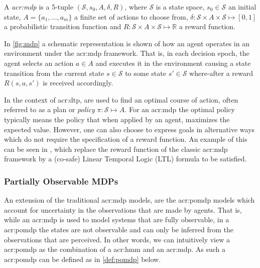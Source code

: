 \begin{definition}
	\label{def:mdp}
	A \textit{\acrfull{acr:mdp}} is a 5-tuple $(\mathcal{S}, s_0, A, \delta, R)$, where $\mathcal{S}$ is a state space, $s_0 \in \mathcal{S}$ an initial state, $A = \{a_1, \ldots, a_m\}$ a finite set of actions to choose from, $\delta: \mathcal{S} \times A \times \mathcal{S} \mapsto [0, 1]$ a probabilistic transition function and $R: \mathcal{S} \times A \times \mathcal{S} \mapsto \mathbb{R}$ a reward function.
\end{definition}

In \autoref{fig:mdp} a schematic representation is shown of how an agent operates in an environment under the \acrshort{acr:mdp} framework.
That is, in each decision epoch, the agent selects an action $a \in A$ and executes it in the environment causing a state transition from the current state $s \in \mathcal{S}$ to some state $s' \in \mathcal{S}$ where-after a reward $R(s, a, s')$ is received accordingly.

In the context of \acrshort{acr:dtp},  are used to find an optimal course of action, often referred to as a plan or \textit{policy} $\pi: \mathcal{S} \mapsto A$.
For an \acrshort{acr:mdp} the optimal policy typically means the policy that when applied by an agent, maximizes the expected value.
However, one can also choose to express goals in alternative ways which do not require the specification of a reward function.
An example of this can be seen in \cite{bhatia2010sampling, lacerda2015optimal}, which replace the reward function of the classic \acrshort{acr:mdp} framework by a (co-safe) Linear Temporal Logic (LTL) formula to be satisfied.

\subsubsection{Partially Observable MDPs}
\label{sec:pomdps}


An extension of the traditional \acrshort{acr:mdp} models, are the \acrfull{acr:pomdp} models which account for uncertainty in the observations that are made by agents.
That is, while an \acrshort{acr:mdp} is used to model systems that are fully observable, in a \acrshort{acr:pomdp} the states are not observable and can only be inferred from the observations that are perceived.
In other words, we can intuitively view a \acrshort{acr:pomdp} as the combination of a \acrshort{acr:hmm} and an \acrshort{acr:mdp}.
As such a \acrshort{acr:pomdp} can be defined as in \autoref{def:pomdp} below.

